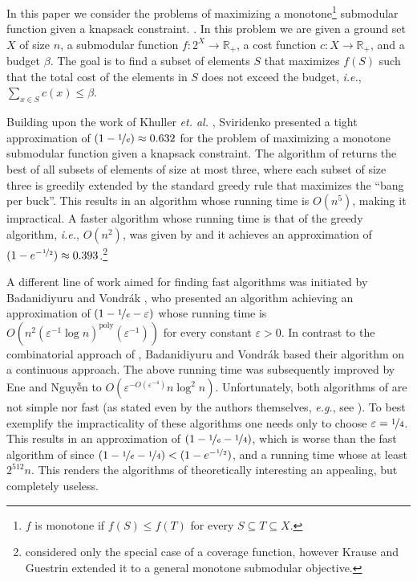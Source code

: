 In this paper we consider the problems of maximizing a monotone\footnote{
    $f$ is monotone if $f(S) \leq f(T)$ for every $S \subseteq T \subseteq X$.
} submodular function given a knapsack constraint.
{\color{red}{ROY: ADD APPLICATIONS SPECIFIC TO OUR PROBLEM HERE WITH A SHORT EXPLANATION}}.
In this problem we are given a ground set
$X$ of size $n$, a submodular function $f:2^X \to \mathbb{R}_+$, a cost function $c:X \to \mathbb{R}_+$, and a budget $\beta$.
The goal is to find a subset of elements $S$ that maximizes $f(S)$ such that the total cost of the elements in $S$ does not exceed the budget, {\em i.e.}, $\sum _{x\in S}c(x)\leq \beta$.

Building upon the work of Khuller {\em et. al.} \cite{khuller1999budgeted}, Sviridenko \cite{sviridenko2004note} presented a tight approximation of $(1-\nicefrac[]{1}{e})\approx 0.632$ for the problem of maximizing a monotone submodular function given a knapsack constraint.
The algorithm of \cite{sviridenko2004note} returns the best of all subsets of elements of size at most three, where each subset of size three is greedily extended by the standard greedy rule that maximizes the ``bang per buck''.
This results in an algorithm whose running time is $O(n^5)$, making it impractical.
A faster algorithm whose running time is that of the greedy algorithm, {\em i.e.}, $O(n^2)$, was given by \cite{khuller1999budgeted} and it achieves an approximation of $(1-e^{-\nicefrac[]{1}{2}})\approx 0.393$.\footnote{\cite{khuller1999budgeted} considered only the special case of a coverage function, however Krause and Guestrin \cite{krause2005note} extended it to a general monotone submodular objective.}

A different line of work aimed for finding fast algorithms was initiated by Badanidiyuru and Vondr\'{a}k \cite{badanidiyuru2014fast}, who presented an algorithm achieving an approximation of $(1-\nicefrac[]{1}{e}-\varepsilon)$ whose running time is $O(n^2(\varepsilon ^{-1}\log n)^\text{poly}(\varepsilon^{-1}))$ for every constant $\varepsilon >0$.
In contrast to the combinatorial approach of \cite{khuller1999budgeted,sviridenko2004note}, Badanidiyuru and Vondr\'{a}k based their algorithm on a continuous approach.
The above running time was subsequently improved by Ene and Nguy\~{\^{e}}n \cite{Alina2017} to $O(\varepsilon^{-O(\varepsilon^{-4})}n \log^2 n)$.
Unfortunately, both algorithms of \cite{Alina2017,badanidiyuru2014fast} are not simple nor fast (as stated even by the authors themselves, {\em e.g.}, see \cite{Alina2017}).
To best exemplify the impracticality of these algorithms one needs only to choose $\varepsilon = \nicefrac[]{1}{4}$.
This results in an approximation of $(1-\nicefrac[]{1}{e}-\nicefrac[]{1}{4})$, which is worse than the fast algorithm of \cite{khuller1999budgeted} since $(1-\nicefrac[]{1}{e}-\nicefrac[]{1}{4})<(1-e^{-\nicefrac[]{1}{2}})$, and a running time whose at least $2^{512} n$.
This renders the algorithms of \cite{Alina2017,badanidiyuru2014fast} theoretically interesting an appealing, but completely useless.

